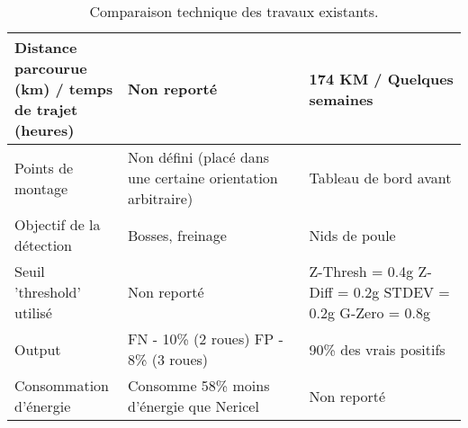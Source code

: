 \begin{table}[]
\begin{tabular}{|m{0.25\linewidth}|m{0.4\linewidth}|m{0.35\linewidth}|}
        \hline
        Distance parcourue (km) / temps de trajet (heures) & Non reporté                                                      & 174 KM / Quelques semaines                               \\
        \hline
        Points de montage                                  & Non défini (placé dans une certaine orientation arbitraire)      & Tableau de bord avant                                    \\
        \hline
        Objectif de la détection                           & Bosses, freinage                                                 & Nids de poule                                            \\
        \hline
        Seuil 'threshold' utilisé                          & Non reporté                                                      & Z-Thresh = 0.4g Z-Diff = 0.2g STDEV = 0.2g G-Zero = 0.8g \\
        \hline
        Output                                             & FN - 10\% (2 roues) FP - 8\% (3 roues)                           & 90\% des vrais positifs                                  \\
        \hline
        Consommation d'énergie                             & Consomme 58\% moins d'énergie que Nericel                        & Non reporté                                              \\
        \hline
    \end{tabular} %

    \caption{Comparaison technique des travaux existants.}
    \label{tab:my-table}
\end{table}

